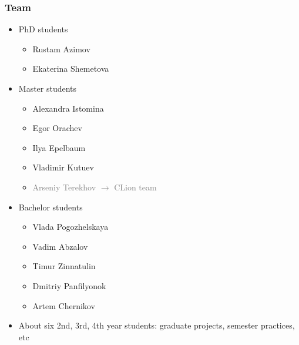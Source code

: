 \documentclass[xcolor=table]{beamer}
\begin{document}
\begin{frame}[fragile]

  \frametitle{Team}
\begin{itemize}
      \item PhD students
      \begin{itemize}
        \item Rustam Azimov
        \item Ekaterina Shemetova
      \end{itemize}
      \item Master students
      \begin{itemize}
        \item Alexandra Istomina
        \item Egor Orachev
        \item Ilya Epelbaum
        \item Vladimir Kutuev
        \item \textcolor{gray}{Arseniy Terekhov $\to$ CLion team}
      \end{itemize}
      \item Bachelor students
      \begin{itemize}
        \item Vlada Pogozhelskaya
        \item Vadim Abzalov
        \item Timur Zinnatulin
        \item Dmitriy Panfilyonok
        \item Artem Chernikov
      \end{itemize}
      \item About six 2nd, 3rd, 4th year students: graduate projects, semester practices, etc
\end{itemize}

\end{frame}
\end{document}

